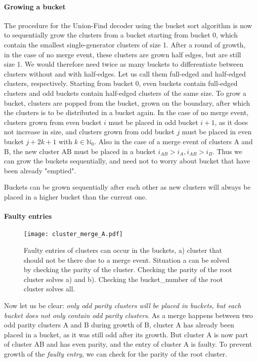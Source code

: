 \paragraph{Growing a bucket}
The procedure for the Union-Find decoder using the bucket sort algorithm is now to sequentially grow the clusters from a bucket starting from bucket 0, which contain the smallest single-generator clusters of size 1. After a round of growth, in the case of no merge event, these clusters are grown half edges, but are still size 1. We would therefore need twice as many buckets to differentiate between clusters without and with half-edges. Let us call them full-edged and half-edged clusters, respectively. Starting from bucket 0, even buckets contain full-edged clusters and odd buckets contain half-edged clusters of the same size. To grow a bucket, clusters are popped from the bucket, grown on the boundary, after which the clusters is to be distributed in a bucket again. In the case of no merge event, clusters grown from even bucket $i$ must be placed in odd bucket $i + 1$, as it does not increase in size, and clusters grown from odd bucket $j$ must be placed in even bucket $j + 2k + 1$ with $k \in \mathbb{N}_0$. Also in the case of a merge event of clusters A and B, the new cluster AB must be placed in a bucket $i_{AB} > i_A, i_{AB} > i_B$. Thus we can grow the buckets sequentially, and need not to worry about bucket that have been already "emptied".
\begin{lemma}
  Buckets can be grown sequentially after each other as new clusters will always be placed in a higher bucket than the current one.
\end{lemma}

\paragraph{Faulty entries}

\begin{figure}
  \centering
  \texttt{[image: cluster\_merge\_A.pdf]}
  \caption{Faulty entries of clusters can occur in the buckets, a) cluster that should not be there due to a merge event. Situation a can be solved by checking the parity of the cluster. Checking the parity of the root cluster solves a) and b). Checking the bucket\_number of the root cluster solves all.}\label{3.fig.clustermergeB}
\end{figure}

Now let us be clear: \emph{only odd parity clusters will be placed in buckets, but each bucket does not only contain odd parity clusters}. As a merge happens between two odd parity clusters A and B during growth of B, cluster A has already been placed in a bucket, as it was still odd after its growth. But cluster A is now part of cluster AB and has even parity, and the entry of cluster A is faulty. To prevent growth of the \emph{faulty entry}, we can check for the parity of the root cluster.

